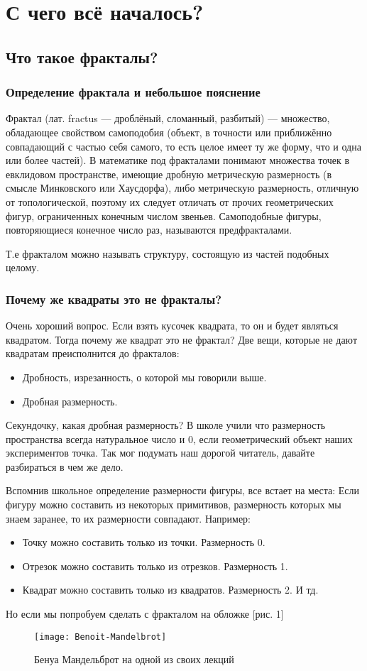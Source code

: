 \chapter{С чего всё началось?}
\section{Что такое фракталы?}
\subsection{Определение фрактала и небольшое пояснение}
Фрактал (лат. fractus — дроблёный, сломанный, разбитый) — множество, обладающее свойством самоподобия (объект, в точности или приближённо совпадающий с частью себя самого, то есть целое имеет ту же форму, что и одна или более частей). В математике под фракталами понимают множества точек в евклидовом пространстве, имеющие дробную метрическую размерность (в смысле Минковского или Хаусдорфа), либо метрическую размерность, отличную от топологической, поэтому их следует отличать от прочих геометрических фигур, ограниченных конечным числом звеньев. Самоподобные фигуры, повторяющиеся конечное число раз, называются предфракталами. 

Т.е фракталом можно называть структуру, состоящую из частей подобных целому.

\subsection{Почему же квадраты это не фракталы?}
Очень хороший вопрос. Если взять кусочек квадрата, то он и будет являться квадратом. Тогда почему же квадрат это не фрактал?
Две вещи, которые не дают квадратам преисполнится до фракталов:
\begin{itemize}
	\item Дробность, изрезанность, о которой мы говорили выше.
	\item Дробная размерность.
\end{itemize}

Секундочку, какая дробная размерность? В школе учили что размерность пространства всегда натуральное число и 0, если геометрический объект наших экспериментов точка. Так мог подумать наш дорогой читатель, давайте разбираться в чем же дело.

Вспомнив школьное определение размерности фигуры, все встает на места:
Если фигуру можно составить из некоторых примитивов, размерность которых мы знаем заранее, то их размерности совпадают. Например:
\begin{itemize}
	\item Точку можно составить только из точки. Размерность 0.
	\item Отрезок можно составить только из отрезков. Размерность 1.
	\item Квадрат можно составить только из квадратов. Размерность 2. И тд.
\end{itemize}

Но если мы попробуем сделать с фракталом на обложке [рис. 1]

\begin{figure}
	\centering
	\texttt{[image: Benoit-Mandelbrot]}
	\caption[рис.1]{Бенуа Мандельброт на одной из своих лекций}
\end{figure}


